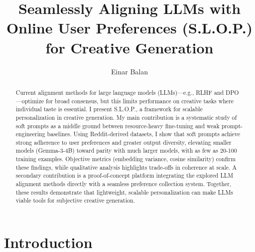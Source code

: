 \documentclass[11pt]{article}
\title{\textbf{S}eamlessly Aligning \textbf{L}LMs with \textbf{O}nline User \textbf{P}references (S.L.O.P.) for Creative Generation}
\author{Einar Balan}
\begin{document}
\maketitle
\begin{abstract}
    Current alignment methods for large language models (LLMs)—e.g., RLHF and DPO—optimize for broad consensus, but this limits performance on creative tasks where individual taste is essential. I present S.L.O.P., a framework for scalable personalization in creative generation. My main contribution is a systematic study of soft prompts as a middle ground between resource-heavy fine-tuning and weak prompt-engineering baselines. Using Reddit-derived datasets, I show that soft prompts achieve strong adherence to user preferences and greater output diversity, elevating smaller models (Gemma-3-4B) toward parity with much larger models, with as few as 20-100 training examples. Objective metrics (embedding variance, cosine similarity) confirm these findings, while qualitative analysis highlights trade-offs in coherence at scale. A secondary contribution is a proof-of-concept platform integrating the explored LLM alignment methods directly with a seamless preference collection system. Together, these results demonstrate that lightweight, scalable personalization can make LLMs viable tools for subjective creative generation.
\end{abstract}


\section{Introduction}



\end{document}
